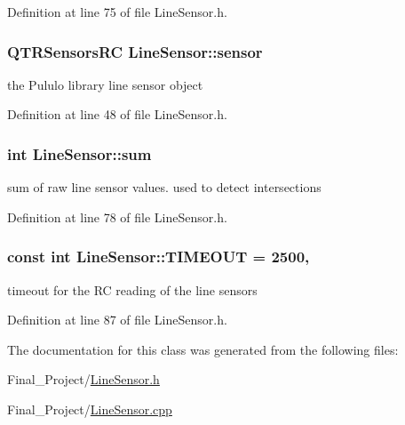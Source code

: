 Definition at line 75 of file Line\-Sensor.\-h.

\hypertarget{classLineSensor_aeb37399c033a623b620803434f2b278f}{
\subsubsection[{sensor}]{\setlength{\rightskip}{0pt plus 5cm}Q\-T\-R\-Sensors\-R\-C Line\-Sensor\-::sensor\hspace{0.3cm}{\ttfamily [private]}}}\label{classLineSensor_aeb37399c033a623b620803434f2b278f}


the Pululo library line sensor object 



Definition at line 48 of file Line\-Sensor.\-h.

\hypertarget{classLineSensor_af574319adc88f5949f03239b2bcbc222}{
\subsubsection[{sum}]{\setlength{\rightskip}{0pt plus 5cm}int Line\-Sensor\-::sum\hspace{0.3cm}{\ttfamily [private]}}}\label{classLineSensor_af574319adc88f5949f03239b2bcbc222}


sum of raw line sensor values. used to detect intersections 



Definition at line 78 of file Line\-Sensor.\-h.

\hypertarget{classLineSensor_ae1de9394d9e0e4ab19628316d1111d8f}{
\subsubsection[{T\-I\-M\-E\-O\-U\-T}]{\setlength{\rightskip}{0pt plus 5cm}const int Line\-Sensor\-::\-T\-I\-M\-E\-O\-U\-T = 2500\hspace{0.3cm}{\ttfamily [static]}, {\ttfamily [private]}}}\label{classLineSensor_ae1de9394d9e0e4ab19628316d1111d8f}


timeout for the R\-C reading of the line sensors 



Definition at line 87 of file Line\-Sensor.\-h.



The documentation for this class was generated from the following files\-:\begin{DoxyCompactItemize}
\item 
Final\-\_\-\-Project/\hyperlink{LineSensor_8h}{Line\-Sensor.\-h}\item 
Final\-\_\-\-Project/\hyperlink{LineSensor_8cpp}{Line\-Sensor.\-cpp}\end{DoxyCompactItemize}
